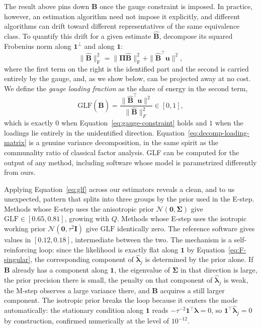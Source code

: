 The result above pins down $\mathbf{B}$ once the gauge constraint is imposed. In practice, however, an estimation algorithm need not impose it explicitly, and different algorithms can drift toward different representatives of the same equivalence class. To quantify this drift for a given estimate $\hat{\mathbf{B}}$, decompose its squared Frobenius norm along $\mathbf{1}^\perp$ and along $\mathbf{1}$:
\begin{equation}
    \|\hat{\mathbf{B}}\|^{2}_{\mathrm{F}}=\|\bm{\Pi}\hat{\mathbf{B}}\|^{2}_{\mathrm{F}}+\|\hat{\mathbf{B}}^{\top}\mathbf{u}\|^{2},
    \label{eq:decomp-loading-matrix}
\end{equation}
where the first term on the right is the identified part and the second is carried entirely by the gauge, and, as we show below, can be projected away at no cost. We define the \emph{gauge loading fraction} as the share of energy in the second term,
\begin{equation}
\mathrm{GLF}(\hat{\mathbf{B}})=\frac{\lVert\hat{\mathbf{B}}^\top\mathbf{u}\rVert^2}{\lVert\hat{\mathbf{B}}\rVert_F^2}\in[0,1],
\label{eq:glf}
\end{equation}
which is exactly $0$ when Equation~\eqref{eq:gauge-constraint} holds and $1$ when the loadings lie entirely in the unidentified direction. Equation~\eqref{eq:decomp-loading-matrix} is a genuine variance decomposition, in the same spirit as the communality ratio of classical factor analysis. GLF can be computed for the output of any method, including software whose model is parametrized differently from ours.

\iffalse
Applying Equation~\eqref{eq:glf} across our estimators reveals a clean, and to us unexpected, pattern that splits into three groups by the prior used in the E-step. Methods whose E-step uses the anisotropic prior $\mathcal{N}(\mathbf{0},\bm{\Sigma})$ give $\mathrm{GLF}\in[0.65,0.81]$, growing with $Q$. Methods whose E-step uses the isotropic working prior $\mathcal{N}(\mathbf{0},\tau^2\mathbf{I})$ give $\mathrm{GLF}$ identically zero. The reference software gives values in $[0.12,0.18]$, intermediate between the two. The mechanism is a self-reinforcing loop: since the likelihood is exactly flat along $\mathbf{1}$ by Equation~\eqref{eq:F-singular}, the corresponding component of $\hat{\bm{\lambda}}_j$ is determined by the prior alone. If $\mathbf{B}$ already has a component along $\mathbf{1}$, the eigenvalue of $\bm{\Sigma}$ in that direction is large, the prior precision there is small, the penalty on that component of $\hat{\bm{\lambda}}_j$ is weak, the M-step observes a large variance there, and $\mathbf{B}$ acquires a still larger component. The isotropic prior breaks the loop because it centers the mode automatically: the stationary condition along $\mathbf{1}$ reads $-\tau^{-2}\mathbf{1}^\top\bm{\lambda}=0$, so $\mathbf{1}^\top\hat{\bm{\lambda}}_j=0$ by construction, confirmed numerically at the level of $10^{-12}$.

